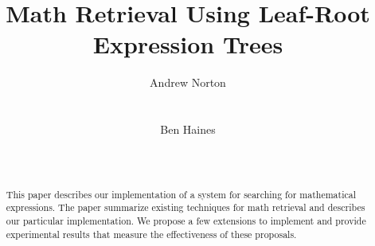 \documentclass{sig-alternate}
\begin{document}
%

\title{Math Retrieval Using Leaf-Root Expression Trees} 

%
\author{
%
%
\alignauthor
Andrew Norton\titlenote{}\\
       \\
       \\
\alignauthor
Ben Haines\titlenote{}\\
       \\
       \\
}

\maketitle
\begin{abstract}
This paper describes our implementation of a system for
searching for mathematical expressions. The paper summarize
existing techniques for math retrieval and describes our particular
implementation. We propose a few extensions to implement and 
provide experimental results that measure the effectiveness of
these proposals.
\end{abstract}
\end{document}
